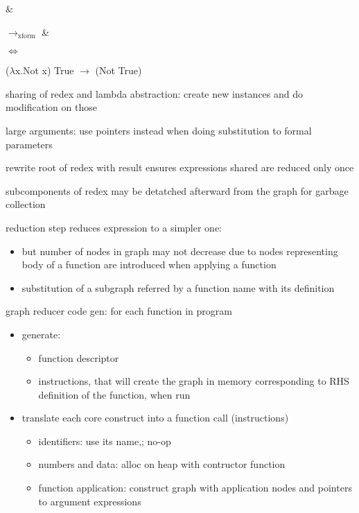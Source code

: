 \documentclass[8pt]{extarticle}
\begin{document}
\begin{multicols*}{2}
\begin{tblr}[]{}
 & 

$\rightarrow_{\text{xform}}$ &

\end{tblr}

$\iff$

($\lambda$x.Not x) True $\rightarrow$ (Not True)

sharing of redex and lambda abstraction: create new instances and do modification on those

large arguments: use pointers instead when doing substitution to formal parameters

rewrite root of redex with result ensures expressions shared are reduced only once

subcomponents of redex may be detatched afterward from the graph for garbage collection

reduction step reduces expression to a simpler one:
\begin{itemize}
\item but number of nodes in graph may not decrease due to nodes representing body of a function are introduced when applying a function
\item substitution of a subgraph referred by a function name with its definition
\end{itemize}

graph reducer code gen:
for each function in program
\begin{itemize}
  \item generate:
    \begin{itemize}
    \item function descriptor
    \item instructions, that will create the graph in memory corresponding to RHS definition of the function, when run
    \end{itemize}
  \item translate each core construct into a function call (instructions)
    \begin{itemize}
      \item identifiers: use its name,; no-op
      \item numbers and data: alloc on heap with contructor function
      \item function application: construct graph with application nodes and pointers to argument expressions
  \end{itemize}
\end{itemize}
  


\end{multicols*}
\end{document}
